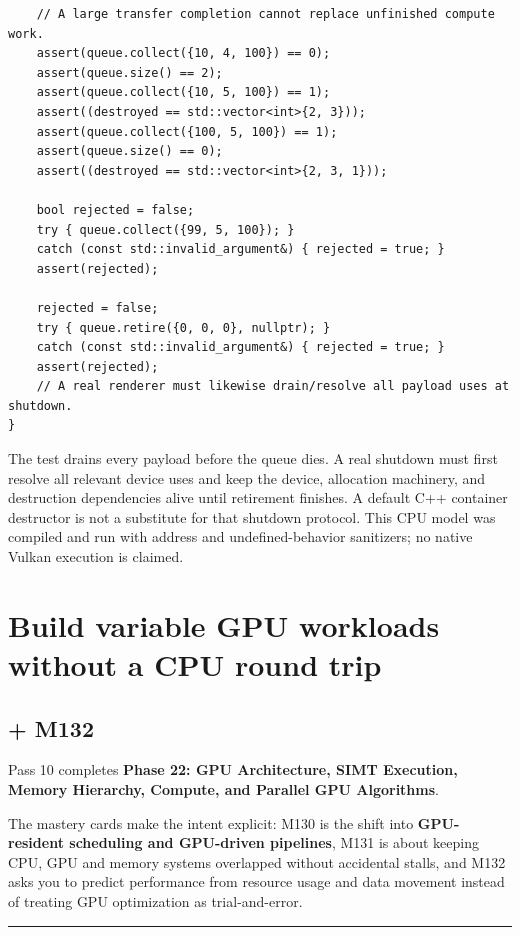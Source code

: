 \begin{verbatim}
    // A large transfer completion cannot replace unfinished compute work.
    assert(queue.collect({10, 4, 100}) == 0);
    assert(queue.size() == 2);
    assert(queue.collect({10, 5, 100}) == 1);
    assert((destroyed == std::vector<int>{2, 3}));
    assert(queue.collect({100, 5, 100}) == 1);
    assert(queue.size() == 0);
    assert((destroyed == std::vector<int>{2, 3, 1}));

    bool rejected = false;
    try { queue.collect({99, 5, 100}); }
    catch (const std::invalid_argument&) { rejected = true; }
    assert(rejected);

    rejected = false;
    try { queue.retire({0, 0, 0}, nullptr); }
    catch (const std::invalid_argument&) { rejected = true; }
    assert(rejected);
    // A real renderer must likewise drain/resolve all payload uses at shutdown.
}
\end{verbatim}

The test drains every payload before the queue dies. A real shutdown must first resolve all relevant device uses and keep the device, allocation machinery, and destruction dependencies alive until retirement finishes. A default C++ container destructor is not a substitute for that shutdown protocol. This CPU model was compiled and run with address and undefined-behavior sanitizers; no native Vulkan execution is claimed.

\section{Build variable GPU workloads without a CPU round trip}\label{05-engine-i-ch019-build-variable-gpu-workloads-without-a-cpu-round-trip}

\subsection{+ M132}\label{05-engine-i-ch019-m132}

Pass 10 completes \textbf{Phase 22: GPU Architecture, SIMT Execution, Memory Hierarchy, Compute, and Parallel GPU Algorithms}.

The mastery cards make the intent explicit: M130 is the shift into \textbf{GPU-resident scheduling and GPU-driven pipelines}, M131 is about keeping CPU, GPU and memory systems overlapped without accidental stalls, and M132 asks you to predict performance from resource usage and data movement instead of treating GPU optimization as trial-and-error.

\begin{center}\rule{0.5\linewidth}{0.5pt}\end{center}

